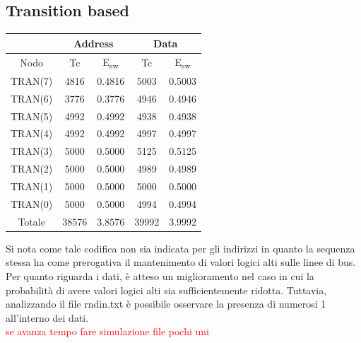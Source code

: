 \documentclass[11pt,  english, makeidx, a4paper, titlepage, oneside]{book}
\begin{document}
\subsection{Transition based}
\begin{center}
	\begin{tabular}{|c|c|c|c|c|}
	\hline
	& \multicolumn{2}{c}{Address} & \multicolumn{2}{c}{Data}\\
	\hline
	Nodo & Tc & E\textsubscript{sw} & Tc & E\textsubscript{sw} \\
	\hline
	TRAN(7) & 4816 & 0.4816 & 5003 & 0.5003\\
	 \hline
	TRAN(6) & 3776 & 0.3776 & 4946 & 0.4946\\
	\hline
	TRAN(5) & 4992 & 0.4992 & 4938 & 0.4938\\
	\hline
	TRAN(4) & 4992 & 0.4992 & 4997 & 0.4997\\
	\hline
	TRAN(3) & 5000 & 0.5000 & 5125 & 0.5125\\
	\hline
	TRAN(2) & 5000 & 0.5000 & 4989 & 0.4989\\
	\hline
	TRAN(1) & 5000 & 0.5000 & 5000 &0.5000 \\
	\hline
	TRAN(0) & 5000 & 0.5000 & 4994 & 0.4994\\
	\hline
	Totale & 38576 & 3.8576 & 39992 & 3.9992\\
	\hline
	\end{tabular}	
\end{center}
\vspace{0.3cm}
Si nota come tale codifica non sia indicata per gli indirizzi in quanto la sequenza stessa ha come prerogativa il mantenimento di valori logici alti sulle linee di bus.
\\
Per quanto riguarda i dati, è atteso un miglioramento nel caso in cui la probabilità di avere valori logici alti sia sufficientemente ridotta. Tuttavia, analizzando il file rndin.txt è possibile osservare la presenza di numerosi 1 all'interno dei dati.
\\
\textcolor{red}{se avanza tempo fare simulazione file pochi uni}
\end{document}
